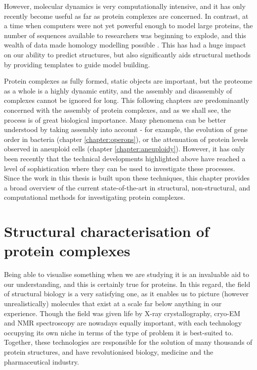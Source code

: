 \documentclass[a4paper,11pt,twoside,openright]{scrbook}
\begin{document}
However, molecular dynamics is very computationally intensive, and it has only recently become useful as far as protein complexes are concerned. In contrast, at a time when computers were not yet powerful enough to model large proteins, the number of sequences available to researchers was beginning to explode, and this wealth of data made homology modelling possible \cite{Rost1996,Xu1998}. This has had a huge impact on our ability to predict structures, but also significantly aids structural methods by providing templates to guide model building.

Protein complexes as fully formed, static objects are important, but the proteome as a whole is a highly dynamic entity, and the assembly and disassembly of complexes cannot be ignored for long. This following chapters are predominantly concerned with the assembly of protein complexes, and as we shall see, the process is of great biological importance. Many phenomena can be better understood by taking assembly into account - for example, the evolution of gene order in bacteria (chapter \ref{chapter:operons}), or the attenuation of protein levels observed in aneuploid cells (chapter \ref{chapter:aneuploidy}). However, it has only been recently that the technical developments highlighted above have reached a level of sophistication where they can be used to investigate these processes. Since the work in this thesis is built upon these techniques, this chapter provides a broad overview of the current state-of-the-art in structural, non-structural, and computational methods for investigating protein complexes.

\section{Structural characterisation of protein complexes}
Being able to visualise something when we are studying it is an invaluable aid to our understanding, and this is certainly true for proteins. In this regard, the field of structural biology is a very satisfying one, as it enables us to picture (however unrealistically) molecules that exist at a scale far below anything in our experience. Though the field was given life by X-ray crystallography, cryo-EM and NMR spectroscopy are nowadays equally important, with each technology occupying its own niche in terms of the type of problem it is best-suited to. Together, these technologies are responsible for the solution of many thousands of protein structures, and have revolutionised biology, medicine and the pharmaceutical industry.
\end{document}
